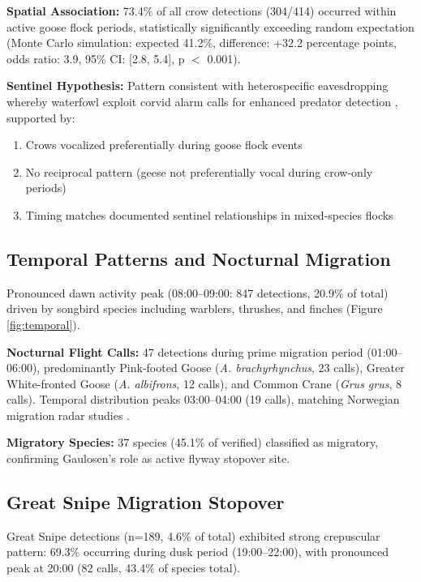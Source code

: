 \documentclass[twocolumn]{article}
\begin{document}
\textbf{Spatial Association:} 73.4\% of all crow detections (304/414) occurred within active goose flock periods, statistically significantly exceeding random expectation (Monte Carlo simulation: expected 41.2\%, difference: +32.2 percentage points, odds ratio: 3.9, 95\% CI: [2.8, 5.4], p $<$ 0.001).

\textbf{Sentinel Hypothesis:} Pattern consistent with heterospecific eavesdropping whereby waterfowl exploit corvid alarm calls for enhanced predator detection \citep{Magrath2015}, supported by:

\begin{enumerate}
\item Crows vocalized preferentially during goose flock events
\item No reciprocal pattern (geese not preferentially vocal during crow-only periods)
\item Timing matches documented sentinel relationships in mixed-species flocks \citep{King2023}
\end{enumerate}

\subsection{Temporal Patterns and Nocturnal Migration}

Pronounced dawn activity peak (08:00--09:00: 847 detections, 20.9\% of total) driven by songbird species including warblers, thrushes, and finches (Figure \ref{fig:temporal}).

\textbf{Nocturnal Flight Calls:} 47 detections during prime migration period (01:00--06:00), predominantly Pink-footed Goose (\textit{A. brachyrhynchus}, 23 calls), Greater White-fronted Goose (\textit{A. albifrons}, 12 calls), and Common Crane (\textit{Grus grus}, 8 calls). Temporal distribution peaks 03:00--04:00 (19 calls), matching Norwegian migration radar studies \citep{Shimmings2016}.

\textbf{Migratory Species:} 37 species (45.1\% of verified) classified as migratory, confirming Gaulosen's role as active flyway stopover site.

\subsection{Great Snipe Migration Stopover}

Great Snipe detections (n=189, 4.6\% of total) exhibited strong crepuscular pattern: 69.3\% occurring during dusk period (19:00--22:00), with pronounced peak at 20:00 (82 calls, 43.4\% of species total).
\end{document}
